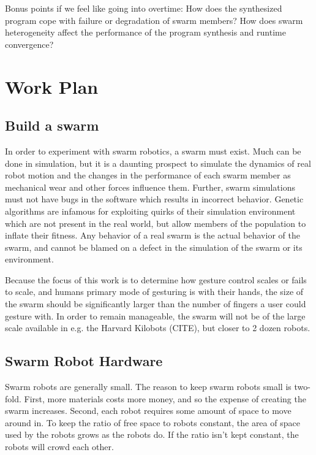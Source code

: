 \documentclass[]{article}
\begin{document}
Bonus points if we feel like going into overtime: How does the synthesized program cope with failure or degradation of swarm members? How does swarm heterogeneity affect the performance of the program synthesis and runtime convergence?


\section{Work Plan}

\subsection{Build a swarm}

In order to experiment with swarm robotics, a swarm must exist. 
Much can be done in simulation, but it is a daunting prospect to simulate the dynamics of real robot motion and the changes in the performance of each swarm member as mechanical wear and other forces influence them. 
Further, swarm simulations must not have bugs in the software which results in incorrect behavior. 
Genetic algorithms are infamous for exploiting quirks of their simulation environment which are not present in the real world, but allow members of the population to inflate their fitness. 
Any behavior of a real swarm is the actual behavior of the swarm, and cannot be blamed on a defect in the simulation of the swarm or its environment. 

Because the focus of this work is to determine how gesture control scales or fails to scale, and humans primary mode of gesturing is with their hands, the size of the swarm should be significantly larger than the number of fingers a user could gesture with. 
In order to remain manageable, the swarm will not be of the large scale available in e.g. the Harvard Kilobots (CITE), but closer to 2 dozen robots. 

\subsection{Swarm Robot Hardware}

Swarm robots are generally small. 
The reason to keep swarm robots small is two-fold. 
First, more materials costs more money, and so the expense of creating the swarm increases. 
Second, each robot requires some amount of space to move around in. 
To keep the ratio of free space to robots constant, the area of space used by the robots grows as the robots do. 
If the ratio isn't kept constant, the robots will crowd each other. 
\end{document}
